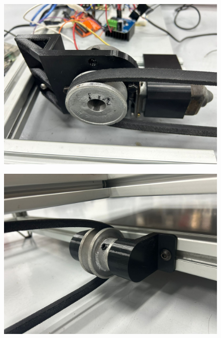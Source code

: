 \begin{figure}[H]
    \centering
    \begin{minipage}{0.32\textwidth}
        \centering
        \includegraphics[width=\textwidth]{MECANISMO/MOTOR_MECANISMO.jpg}
        \label{fig:motor_mecanismo}
    \end{minipage}%
    \hfill
    \begin{minipage}{0.32\textwidth}
        \centering
        \includegraphics[width=\textwidth]{MECANISMO/MECANISMO_CHUMACERAS.jpg}
        \label{fig:mecanismo_chumaceras}
    \end{minipage}%
    \hfill
    \begin{minipage}{0.32\textwidth}

\end{minipage}
\end{figure}
